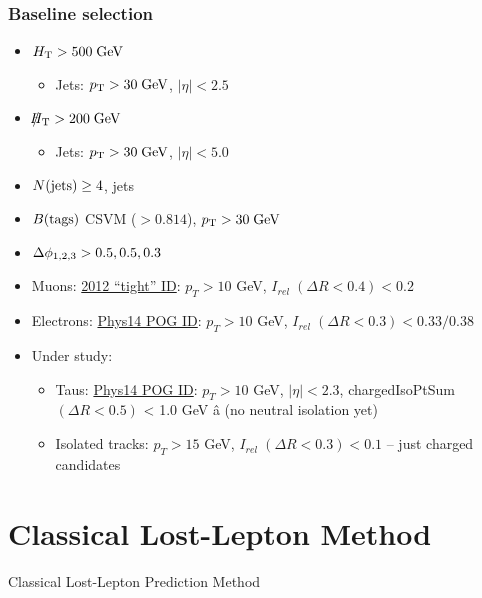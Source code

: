 \documentclass{beamer}
\begin{document}
\begin{frame}
\frametitle{Baseline selection}
\normalsize
\begin{itemize}
 \item $H_{\text{T}} >500 \;\text{Ge}\kern-0.06667em\text{V}$
 \begin{itemize}
       \item Jets: $p_{\text{T}}>30\;\text{Ge}\kern-0.06667em\text{V}$, $|\eta|<2.5$
      \end{itemize}
 \item $\slash\mkern-12mu{H}_{\text{T}} >200 \;\text{Ge}\kern-0.06667em\text{V}$
  \begin{itemize}
       \item Jets: $p_{\text{T}}>30\;\text{Ge}\kern-0.06667em\text{V}$, $|\eta|<5.0$
      \end{itemize}
 \item $N(\text{jets})\ge 4$, \HT jets
 \item $B(\text{tags})$ CSVM ($>0.814$), $p_{\text{T}}>30\;\text{Ge}\kern-0.06667em\text{V}$
 \item $\Delta\phi_{1,2,3}>0.5,0.5,0.3$
\item Muons: \href{https://twiki.cern.ch/twiki/bin/view/CMSPublic/SWGuideMuonId\#Tight\_Muon}{2012 ``tight'' ID}: $p_T > 10$ GeV, $I_{rel}\; (\Delta R<0.4) < 0.2$    
    \item Electrons: \href{https://twiki.cern.ch/twiki/bin/viewauth/CMS/CutBasedElectronIdentificationRun2\#CSA14\_selection\_conditions\_25ns}{Phys14 POG ID}:  $p_T > 10$ GeV, $I_{rel}\;
      (\Delta R<0.3) < 0.33 / 0.38$
      \item Under study:
      \begin{itemize}


    \item Taus: \href{https://indico.cern.ch/event/359233/contribution/4/material/slides/0.pdf}{Phys14 POG ID}: $p_T > 10$ GeV, $|\eta| < 2.3$,
      chargedIsoPtSum $(\Delta R<0.5)$ < 1.0 GeV â (no neutral isolation yet)
    \item Isolated tracks: $p_T > 15$ GeV, $I_{rel}\;(\Delta R<0.3) < 0.1$ -- just charged candidates
      \end{itemize}
\end{itemize}
\end{frame}

\section{Classical Lost-Lepton Method}
\begin{frame}
  \begin{center}
    {\Large
     Classical Lost-Lepton Prediction Method }
  \end{center}
\end{frame}
\end{document}
